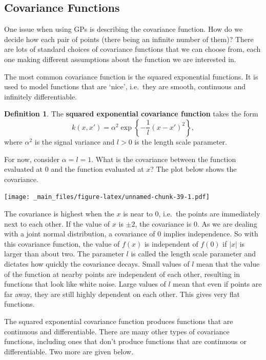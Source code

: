 \documentclass[
]{book}
\theoremstyle{definition}
\newtheorem{definition}{Definition}[chapter]
\theoremstyle{definition}
\theoremstyle{definition}
\theoremstyle{definition}
\theoremstyle{remark}
\begin{document}
\hypertarget{covariance-functions}{%
\subsection{Covariance Functions}\label{covariance-functions}}

One issue when using GPs is describing the covariance function. How do we decide how each pair of points (there being an infinite number of them)? There are lots of standard choices of covariance functions that we can choose from, each one making different assumptions about the function we are interested in.

The most common covariance function is the squared exponential functions. It is used to model functions that are `nice', i.e.~they are smooth, continuous and infinitely differentiable.

\begin{definition}
The \textbf{squared exponential covariance function} takes the form
\[
k(x, x') = \alpha^2\exp\left\{-\frac{1}{l}(x-x')^2\right\},
\]
where \(\alpha^2\) is the signal variance and \(l>0\) is the length scale parameter.
\end{definition}

For now, consider \(\alpha = l = 1\). What is the covariance between the function evaluated at 0 and the function evaluated at \(x\)? The plot below shows the covariance.

\texttt{[image: \_main\_files/figure-latex/unnamed-chunk-39-1.pdf]}

The covariance is highest when the \(x\) is near to 0, i.e.~the points are immediately next to each other. If the value of \(x\) is \(\pm 2\), the covariance is 0. As we are dealing with a joint normal distribution, a covariance of 0 implies independence. So with this covariance function, the value of \(f(x)\) is independent of \(f(0)\) if \(|x|\) is larger than about two. The parameter \(l\) is called the length scale parameter and dictates how quickly the covariance decays. Small values of \(l\) mean that the value of the function at nearby points are independent of each other, resulting in functions that look like white noise. Large values of \(l\) mean that even if points are far away, they are still highly dependent on each other. This gives very flat functions.

The squared exponential covariance function produces functions that are continuous and differentiable. There are many other types of covariance functions, including ones that don't produce functions that are continuous or differentiable. Two more are given below.
\end{document}
